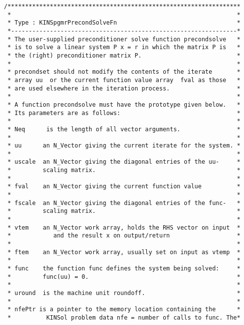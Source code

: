 \documentclass[11pt]{article}
\begin{document}
\begin{verbatim}
/******************************************************************
 *                                                                *           
 * Type : KINSpgmrPrecondSolveFn                                  *
 *----------------------------------------------------------------*
 * The user-supplied preconditioner solve function precondsolve   *
 * is to solve a linear system P x = r in which the matrix P is   *
 * the (right) preconditioner matrix P.                           *
 *                                                                *
 * precondset should not modify the contents of the iterate       *
 * array uu  or the current function value array  fval as those   *
 * are used elsewhere in the iteration process.                   *
 *                                                                *
 * A function precondsolve must have the prototype given below.   *
 * Its parameters are as follows:                                 *
 *                                                                *
 * Neq      is the length of all vector arguments.                *
 *                                                                *
 * uu      an N_Vector giving the current iterate for the system. *
 *                                                                *
 * uscale  an N_Vector giving the diagonal entries of the uu-     *
 *         scaling matrix.                                        *
 *                                                                *
 * fval    an N_Vector giving the current function value          *
 *                                                                *
 * fscale  an N_Vector giving the diagonal entries of the func-   *
 *         scaling matrix.                                        *
 *                                                                *
 * vtem    an N_Vector work array, holds the RHS vector on input  *
 *            and the result x on output/return                   *
 *                                                                *
 * ftem    an N_Vector work array, usually set on input as vtemp  *
 *                                                                *
 * func    the function func defines the system being solved:     *
 *         func(uu) = 0.                                          *
 *                                                                *
 * uround  is the machine unit roundoff.                          *
 *                                                                *
 * nfePtr is a pointer to the memory location containing the      *
 *          KINSol problem data nfe = number of calls to func. The*

\end{verbatim}
\end{document}
